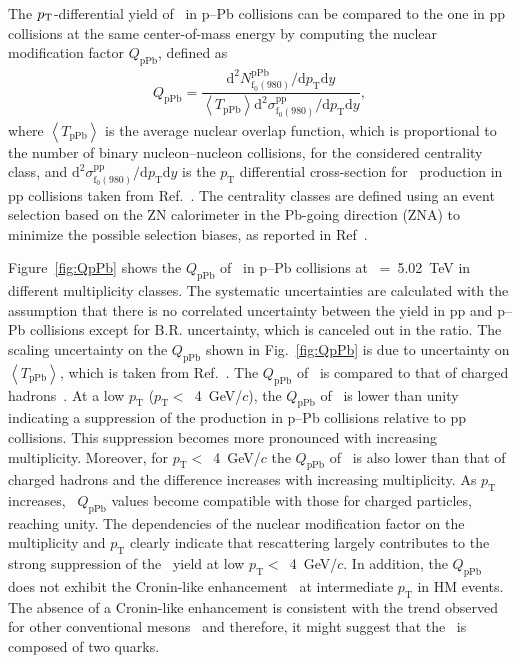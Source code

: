 The $p_{\rm{T}}$-differential yield of \fzero~in p--Pb collisions can be compared to the one in pp collisions at the same center-of-mass energy by computing the nuclear modification factor $Q_{\mbox{pPb}}$, defined as 
\begin{eqnarray}
Q_{\mbox{pPb}} = \dfrac{\mathrm{d}^{2} N_{\mathrm{f}_{0}(980)}^{\mathrm{pPb}} / \mathrm{d} p_{\mathrm{T}} \mathrm{d}y }{ \left\langle T_{\mathrm{pPb}} \right\rangle \mathrm{d}^{2} \sigma_{\mathrm{f}_{0}(980)}^{\mathrm{pp}}/ \mathrm{d} p_{\mathrm{T}} \mathrm{d}y },
\end{eqnarray}
where $\left\langle T_{\mathrm{pPb}} \right\rangle$ is the average nuclear overlap function, which is proportional to the number of binary nucleon--nucleon collisions, for the considered centrality class, and $\mathrm{d}^{2} \sigma_{\mathrm{f}_{0}(980)}^{\mathrm{pp}}/ \mathrm{d} p_{\mathrm{T}} \mathrm{d}y$ is the $p_{\mathrm{T}}$ differential cross-section for \fzero~production in pp collisions taken from Ref.~\cite{ALICE:2022qnb}. The centrality classes are defined using an event selection based on the ZN calorimeter in the Pb-going direction (ZNA) to minimize the possible selection biases, as reported in Ref~\cite{ALICE:2014xsp}.

Figure~\ref{fig:QpPb} shows the $Q_{\mbox{pPb}}$ of \fzero~in p--Pb collisions at \snn~=~5.02~TeV in different multiplicity classes. The systematic uncertainties are calculated with the assumption that there is no correlated uncertainty between the yield in pp and p--Pb collisions except for B.R. uncertainty, which is canceled out in the ratio. The scaling uncertainty on the $Q_{\mbox{pPb}}$ shown in Fig.~\ref{fig:QpPb} is due to uncertainty on $\left\langle T_{\mathrm{pPb}} \right\rangle$, which is taken from Ref.~\cite{ALICE:2014xsp}. The $Q_{\mbox{pPb}}$ of \fzero~is compared to that of charged hadrons~\cite{ALICE:2014xsp}. At a low $p_{\mathrm{T}}$ ($p_{\mathrm{T}}<$~4~GeV/$c$), the $Q_{\mbox{pPb}}$ of \fzero~is lower than unity indicating a suppression of the production in p--Pb collisions relative to pp collisions. This suppression becomes more pronounced with increasing multiplicity. Moreover, for $p_{\mathrm{T}}<$~4~GeV/$c$ the $Q_{\mbox{pPb}}$ of \fzero~is also lower than that of charged hadrons and the difference increases with increasing multiplicity. As $p_{\mathrm{T}}$ increases, \fzero~$Q_{\mbox{pPb}}$ values become compatible with those for charged particles, reaching unity. The dependencies of the nuclear modification factor on the multiplicity and $p_{\mathrm{T}}$ clearly indicate that rescattering largely contributes to the strong suppression of the \fzero~yield at low $p_{\mathrm{T}}<$~4~GeV/$c$. In addition, the $Q_{\mbox{pPb}}$ does not exhibit the Cronin-like enhancement~\cite{Cronin:1974zm} at intermediate $p_{\mathrm{T}}$ in HM events. The absence of a Cronin-like enhancement is consistent with the trend observed for other conventional mesons~\cite{ALICE:2016dei, ALICE:2016sak} and therefore, it might suggest that the \fzero~is composed of two quarks.